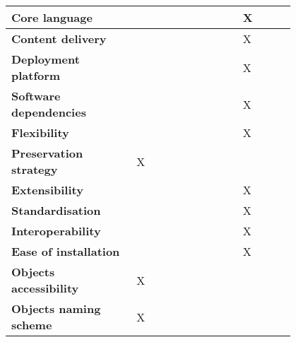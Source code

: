 \begin{longtable}{
>{\arraybackslash}p{0.35\linewidth}|
>{\centering\arraybackslash}p{0.15\linewidth}|
>{\centering\arraybackslash}p{0.15\linewidth}|
>{\centering\arraybackslash}p{0.15\linewidth}}
 \cline{1-4}

 \textbf{Core language}&
 {}&
 {}&
 {X}\\

 \cline{1-4}

 \textbf{Content delivery}&
 {}&
 {}&
 {X}\\

 \cline{1-4}

 \textbf{Deployment platform}&
 {}&
 {}&
 {X}\\

 \cline{1-4}

 \textbf{Software dependencies}&
 {}&
 {}&
 {X}\\

 \cline{1-4}

 \textbf{Flexibility}&
 {}&
 {}&
 {X}\\

 \cline{1-4}

 \textbf{Preservation strategy}&
 {X}&
 {}&
 {}\\

 \cline{1-4}

 \textbf{Extensibility}&
 {}&
 {}&
 {X}\\

 \cline{1-4}

 \textbf{Standardisation}&
 {}&
 {}&
 {X}\\

 \cline{1-4}

 \textbf{Interoperability}&
 {}&
 {}&
 {X}\\

 \cline{1-4}

 \textbf{Ease of installation}&
 {}&
 {}&
 {X}\\

 \cline{1-4}

 \textbf{Objects accessibility}&
 {X}&
 {}&
 {}\\

 \cline{1-4}

 \textbf{Objects naming scheme}&
 {X}&
 {}&
 {}\\


\end{longtable}
